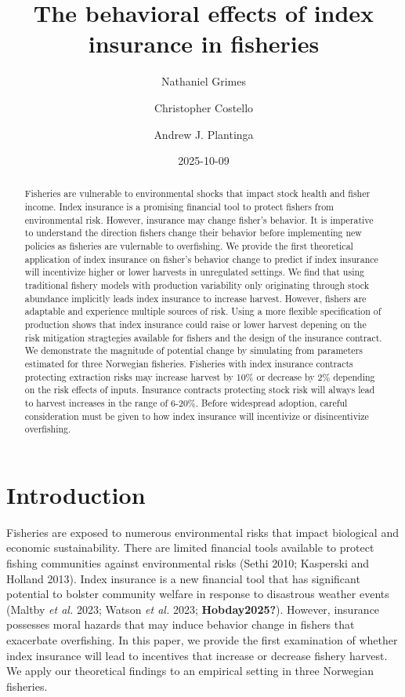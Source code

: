 \documentclass[
  letterpaper,
  DIV=11,
  numbers=noendperiod]{scrartcl}
\title{The behavioral effects of index insurance in fisheries}
\author{Nathaniel Grimes \and Christopher Costello \and Andrew J.
Plantinga}
\date{2025-10-09}
\renewcommand*\contentsname{Table of contents}
\newcommand\contentsname{Table of contents}
\theoremstyle{plain}
\theoremstyle{plain}
\theoremstyle{remark}
\begin{document}
\maketitle
\begin{abstract}
Fisheries are vulnerable to environmental shocks that impact stock
health and fisher income. Index insurance is a promising financial tool
to protect fishers from environmental risk. However, insurance may
change fisher's behavior. It is imperative to understand the direction
fishers change their behavior before implementing new policies as
fisheries are vulernable to overfishing. We provide the first
theoretical application of index insurance on fisher's behavior change
to predict if index insurance will incentivize higher or lower harvests
in unregulated settings. We find that using traditional fishery models
with production variability only originating through stock abundance
implicitly leads index insurance to increase harvest. However, fishers
are adaptable and experience multiple sources of risk. Using a more
flexible specification of production shows that index insurance could
raise or lower harvest depening on the risk mitigation stragtegies
available for fishers and the design of the insurance contract. We
demonstrate the magnitude of potential change by simulating from
parameters estimated for three Norwegian fisheries. Fisheries with index
insurance contracts protecting extraction risks may increase harvest by
10\% or decrease by 2\% depending on the risk effects of inputs.
Insurance contracts protecting stock risk will always lead to harvest
increases in the range of 6-20\%. Before widespread adoption, careful
consideration must be given to how index insurance will incentivize or
disincentivize overfishing.
\end{abstract}

\renewcommand*\contentsname{Table of contents}
{
\hypersetup{linkcolor=}
\setcounter{tocdepth}{3}
\tableofcontents
}

\section{Introduction}\label{introduction}

Fisheries are exposed to numerous environmental risks that impact
biological and economic sustainability. There are limited financial
tools available to protect fishing communities against environmental
risks (Sethi 2010; Kasperski and Holland 2013). Index insurance is a new
financial tool that has significant potential to bolster community
welfare in response to disastrous weather events (Maltby \emph{et al.}
2023; Watson \emph{et al.} 2023; \textbf{Hobday2025?}). However,
insurance possesses moral hazards that may induce behavior change in
fishers that exacerbate overfishing. In this paper, we provide the first
examination of whether index insurance will lead to incentives that
increase or decrease fishery harvest. We apply our theoretical findings
to an empirical setting in three Norwegian fisheries.
\end{document}

